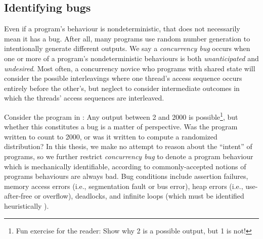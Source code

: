 \subsection{Identifying bugs}

Even if a program's behaviour is nondeterministic, that does not necessarily mean it has a bug.
After all, many programs use random number generation to intentionally generate different outputs.
We say a {\em concurrency bug} occurs when one or more of a program's nondeterministic behaviours is both {\em unanticipated} and {\em undesired}.
Most often, a concurrency novice who programs with shared state will consider the possible interleavings where one thread's access sequence occurs entirely before the other's, but neglect to consider intermediate outcomes in which the threads' access sequences are interleaved.

Consider the program in : Any output between 2 and 2000 is possible\footnote{
	Fun exercise for the reader: Show why 2 is a possible output, but 1 is not!
},
but whether this constitutes a bug is a matter of perspective.
Was the program written to count to 2000, or was it written to compute a randomized distribution?
In this thesis, we make no attempt to reason about the ``intent'' of programs,
so we further restrict {\em concurrency bug} to denote a program behaviour which is mechanically identifiable,
according to commonly-accepted notions of  programs behaviours are always bad.
%
Bug conditions include assertion failures,
memory access errors (i.e., segmentation fault or bus error),
heap errors (i.e., use-after-free or overflow),
deadlocks,
and infinite loops (which must be identified heuristically \cite{entscheidungsproblem}).

